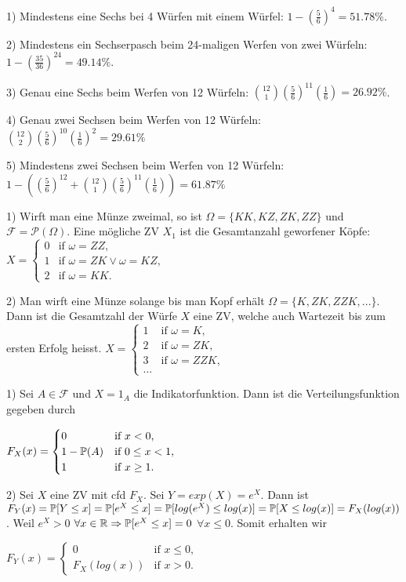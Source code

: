 
1) Mindestens eine Sechs bei 4 Würfen mit einem Würfel: $1-(\frac{5}{6})^4 = 51.78\%$.

2) Mindestens ein Sechserpasch beim 24-maligen Werfen von zwei Würfeln: $1-(\frac{35}{36})^{24} = 49.14\%$.

3) Genau eine Sechs beim Werfen von 12 Würfeln: ${12\choose 1}(\frac{5}{6})^{11}(\frac{1}{6})=26.92\%$.

4) Genau zwei Sechsen beim Werfen von 12 Würfeln: ${12\choose 2}(\frac{5}{6})^{10}(\frac{1}{6})^2=29.61\%$

5) Mindestens zwei Sechsen beim Werfen von 12 Würfeln: $1 - ((\frac{5}{6})^{12} + {12\choose 1}(\frac{5}{6})^{11}(\frac{1}{6}))=61.87\%$

1) Wirft man eine Münze zweimal, so ist $\Omega=\{KK,KZ,ZK,ZZ\}$ und $\mathcal{F}=\mathcal{P}(\Omega)$. Eine mögliche ZV $X_1$ ist die Gesamtanzahl geworfener Köpfe: $X = \begin{cases}
    0 & \text{if } \omega = ZZ, \\
    1 & \text{if } \omega = ZK \lor \omega = KZ, \\
    2 & \text{if } \omega = KK.
  \end{cases}$

2) Man wirft eine Münze solange bis man Kopf erhält $\Omega=\{K,ZK,ZZK,...\}$. Dann ist die Gesamtzahl der Würfe $X$ eine ZV, welche auch Wartezeit bis zum ersten Erfolg heisst. $X = \begin{cases}
    1 & \text{if } \omega = K, \\
    2 & \text{if } \omega = ZK, \\
    3 & \text{if } \omega = ZZK, \\
    \hdots &
  \end{cases}$


1) Sei $A\in\mathcal{F}$ und $X=1_A$ die Indikatorfunktion. Dann ist die Verteilungsfunktion gegeben durch



$F_X(x) = \begin{cases}
    0 & \text{if } x<0, \\
    1-\P(A) & \text{if } 0\leq x<1, \\
    1 & \text{if } x\geq 1.
\end{cases}$

2) Sei $X$ eine ZV mit cfd $F_X$. Sei $Y=exp(X)=e^X$. Dann ist $F_Y(x)=\P[Y\leq x]=\P[e^X\leq x]=\P[log(e^X)\leq log(x)]=\P[X\leq log(x)]=F_X(log(x))$. Weil $e^X>0$ $\forall x\in\R \Rightarrow \P[e^X\leq x]=0$ $\forall x\leq 0$. Somit erhalten wir
 
$F_Y(x) = \begin{cases}
    0 & \text{if } x\leq 0, \\
    F_X(log(x)) & \text{if } x>0.
\end{cases}$